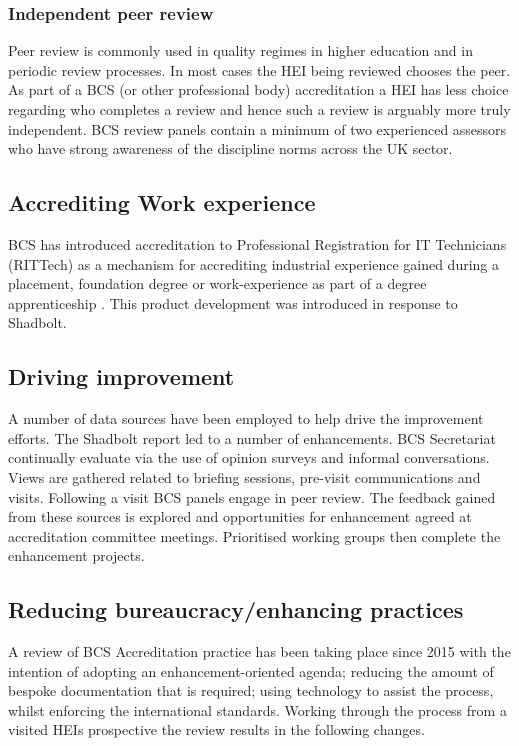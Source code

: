 \documentclass[sigconf]{acmart}
\begin{document}
\subsubsection{Independent peer review}
Peer review is commonly used in quality regimes in higher education and in periodic review processes. In most cases the HEI being reviewed chooses the peer. As part of a BCS (or other professional body) accreditation a HEI has less choice regarding who completes a review and hence such a review is arguably more truly independent. BCS review panels contain a minimum of two experienced assessors who have strong awareness of the discipline norms across the UK sector.

\subsection{Accrediting Work experience}
BCS has introduced accreditation to Professional Registration for IT Technicians (RITTech) as a mechanism for accrediting industrial experience gained during a placement, foundation degree or work-experience as part of a degree apprenticeship \cite[p8]{BCS2018a}. This product development was introduced in response to Shadbolt.

\subsection{Driving improvement}
A number of data sources have been employed to help drive the improvement efforts. The Shadbolt report led to a number of enhancements. BCS Secretariat continually evaluate via the use of opinion surveys and informal conversations. Views are gathered related to briefing sessions, pre-visit communications and visits. Following a visit BCS panels engage in peer review. The feedback gained from these sources is explored and opportunities for enhancement agreed at accreditation committee meetings. Prioritised working groups then complete the enhancement projects. 

\subsection{Reducing bureaucracy/enhancing practices}
A review of BCS Accreditation practice has been taking place since 2015 with the intention of adopting an enhancement-oriented agenda; reducing the amount of bespoke documentation that is required; using technology to assist the process, whilst enforcing the international standards. Working through the process from a visited HEIs prospective the review results in the following changes.
\end{document}
